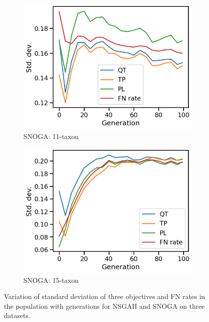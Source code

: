 \begin{figure}[!htbp]
\begin{subfigure}[b]{0.3\textwidth}
			\includegraphics[width=\textwidth]{Figure/11-taxon_NOSSGA_std_dev}
			\caption{SNOGA: 11-taxon}
		\end{subfigure}%
		\begin{subfigure}[b]{0.3\textwidth}
			\includegraphics[width=\textwidth]{Figure/15-taxon_NOSSGA_std_dev}
			\caption{SNOGA: 15-taxon}
		\end{subfigure}
		\caption{Variation of standard deviation of three objectives and FN rates in the population with generations for NSGAII and SNOGA on three datasets.}
		\label{fig:gen_wise_std_dev}
\end{figure}

